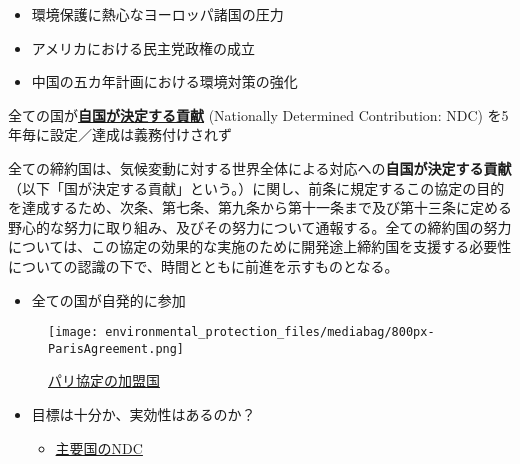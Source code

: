 \documentclass[
  xelatex,
  ja=standard]{bxjsarticle}
\providecommand{\tightlist}{%
  \setlength{\itemsep}{0pt}\setlength{\parskip}{0pt}}\usepackage{longtable,booktabs,array}
\begin{document}
\begin{itemize}
\tightlist
\item
  環境保護に熱心なヨーロッパ諸国の圧力
\item
  アメリカにおける民主党政権の成立
\item
  中国の五カ年計画における環境対策の強化
\end{itemize}

全ての国が\href{https://www4.unfccc.int/sites/NDCStaging/Pages/All.aspx}{\textbf{自国が決定する貢献}}
(Nationally Determined Contribution: NDC)
を5年毎に設定／達成は義務付けされず

\begin{tcolorbox}[enhanced jigsaw, title=\textcolor{quarto-callout-note-color}{\faInfo}\hspace{0.5em}{\href{https://www.env.go.jp/earth/ondanka/cop/shiryo.html}{パリ協定}　第3条}, bottomtitle=1mm, rightrule=.15mm, breakable, arc=.35mm, leftrule=.75mm, opacityback=0, colbacktitle=quarto-callout-note-color!10!white, left=2mm, coltitle=black, toptitle=1mm, titlerule=0mm, colback=white, bottomrule=.15mm, toprule=.15mm, colframe=quarto-callout-note-color-frame, opacitybacktitle=0.6]

全ての締約国は、気候変動に対する世界全体による対応への\textbf{自国が決定する貢献}（以下「国が決定する貢献」という。）に関し、前条に規定するこの協定の目的を達成するため、次条、第七条、第九条から第十一条まで及び第十三条に定める野心的な努力に取り組み、及びその努力について通報する。全ての締約国の努力については、この協定の効果的な実施のために開発途上締約国を支援する必要性についての認識の下で、時間とともに前進を示すものとなる。

\end{tcolorbox}

\begin{itemize}
\tightlist
\item
  全ての国が自発的に参加
\end{itemize}

\begin{figure}[htpb]

{\centering \texttt{[image: environmental\_protection\_files/mediabag/800px-ParisAgreement.png]}

}

\caption{\href{https://commons.wikimedia.org/wiki/File:ParisAgreement.svg}{パリ協定の加盟国}}

\end{figure}

\begin{itemize}
\tightlist
\item
  目標は十分か、実効性はあるのか？

  \begin{itemize}
  \tightlist
  \item
    \href{https://www.mofa.go.jp/mofaj/ic/ch/page1w_000121.html}{主要国のNDC}
  \end{itemize}
\end{itemize}
\end{document}
